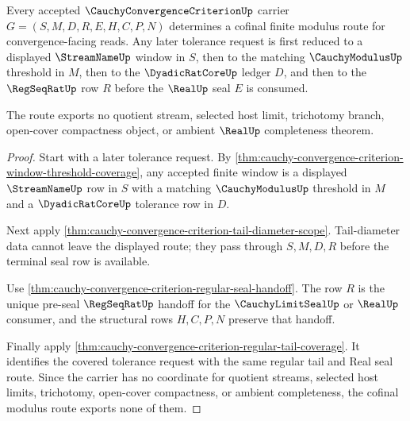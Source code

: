 \begin{theorem}
\label{thm:cauchy-convergence-criterion-cofinal-modulus-extraction}
Every accepted $\CauchyConvergenceCriterionUp$ carrier $G=(S,M,D,R,E,H,C,P,N)$ determines a cofinal finite modulus route for convergence-facing reads. Any later tolerance request is first reduced to a displayed $\StreamNameUp$ window in $S$, then to the matching $\CauchyModulusUp$ threshold in $M$, then to the $\DyadicRatCoreUp$ ledger $D$, and then to the $\RegSeqRatUp$ row $R$ before the $\RealUp$ seal $E$ is consumed.

The route exports no quotient stream, selected host limit, trichotomy branch, open-cover compactness object, or ambient $\RealUp$ completeness theorem.
\end{theorem}
\begin{proof}
Start with a later tolerance request. By \autoref{thm:cauchy-convergence-criterion-window-threshold-coverage}, any accepted finite window is a displayed $\StreamNameUp$ row in $S$ with a matching $\CauchyModulusUp$ threshold in $M$ and a $\DyadicRatCoreUp$ tolerance row in $D$.

Next apply \autoref{thm:cauchy-convergence-criterion-tail-diameter-scope}. Tail-diameter data cannot leave the displayed route; they pass through $S,M,D,R$ before the terminal seal row is available.

Use \autoref{thm:cauchy-convergence-criterion-regular-seal-handoff}. The row $R$ is the unique pre-seal $\RegSeqRatUp$ handoff for the $\CauchyLimitSealUp$ or $\RealUp$ consumer, and the structural rows $H,C,P,N$ preserve that handoff.

Finally apply \autoref{thm:cauchy-convergence-criterion-regular-tail-coverage}. It identifies the covered tolerance request with the same regular tail and Real seal route. Since the carrier has no coordinate for quotient streams, selected host limits, trichotomy, open-cover compactness, or ambient completeness, the cofinal modulus route exports none of them.
\end{proof}

